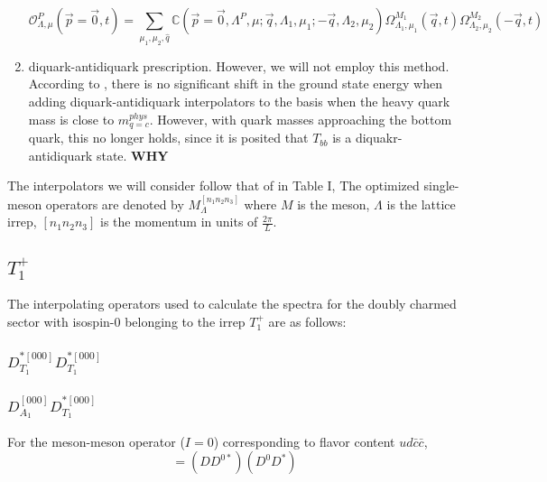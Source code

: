 \begin{table}
\begin{enumerate}
    \begin{equation}
        \mathcal{O}_{\Lambda,\mu}^P(\vec{p}=\vec{0},t) = \sum_{\mu_1,\mu_2,\hat{q}} \mathbb{C}(\vec{p} = \vec{0},\Lambda^P,\mu;\vec{q},\Lambda_1,\mu_1;-\vec{q},\Lambda_2,\mu_2) \Omega^{M_1}_{\Lambda_1,\mu_1}(\vec{q},t) \Omega^{M_2}_{\Lambda_2,\mu_2}(-\vec{q},t)
    \end{equation}


    \item diquark-antidiquark prescription. However, we will not employ this method. According to \cite{Pacheco_2023}, there is no significant shift in the ground state energy when adding diquark-antidiquark interpolators to the basis when the heavy quark mass is close to $m_{q=c}^{phys}$. However, with quark masses approaching the bottom quark, this no longer holds, since it is posited that $T_{bb}$ is a diquakr-antidiquark state. \textbf{WHY}
\end{enumerate}

The interpolators we will consider follow that of \cite{Padmanath_2022} in Table I, 
The optimized single-meson operators are denoted by $M^{[n_1n_2n_3]}_{\Lambda}$ where $M$ is the meson, $\Lambda$ is the lattice irrep, $[n_1n_2n_3]$ is the momentum in units of $\frac{2\pi}{L}$.  \cite{Cheung_2017}

\subsection{$T_1^+$}
The interpolating operators used to calculate the spectra for the doubly charmed sector with isospin-0 belonging to the irrep $T_1^+$ are as follows:
\subsubsection*{$D^{*[000]}_{T_1}D^{*[000]}_{T_1}$}



\subsubsection{$D^{[000]}_{A_1}D^{*[000]}_{T_1}$}
For the meson-meson operator ($I=0$) corresponding to flavor content $ud\bar{c}\bar{c}$,
    \begin{equation}
    [(M_1M_2^*)(M_2M_1^*)] = (DD^{0*})(D^0D^*)
    \end{equation}


\end{table}
